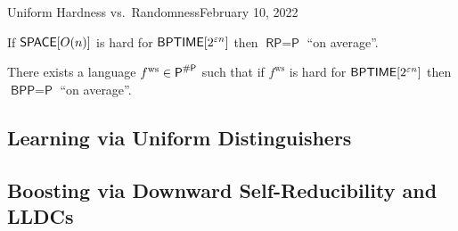 \begin{lecture}{4}{Uniform Hardness vs.\ Randomness}{February 10, 2022}
\begin{theorem}
	If
	$\textsf{SPACE}[O(n)]$ is hard for $\textsf{BPTIME}[2^{\varepsilon n}]$
	then
	$\textsf{RP} = \textsf{P}$ ``on average''.
\end{theorem}

\newcommand{\fws}{\ensuremath{ f^{\text{ws}} }}
\begin{theorem}
	There exists a language $\fws \in \textsf{P}^{\sharpp}$ such that if $\fws$
	is hard for $\textsf{BPTIME}[2^{\varepsilon n}]$ then
	$\textsf{BPP} = \textsf{P}$ ``on average''.
\end{theorem}

\subsection{Learning via Uniform Distinguishers}

\subsection{Boosting via Downward Self-Reducibility and LLDCs}

\end{lecture}
